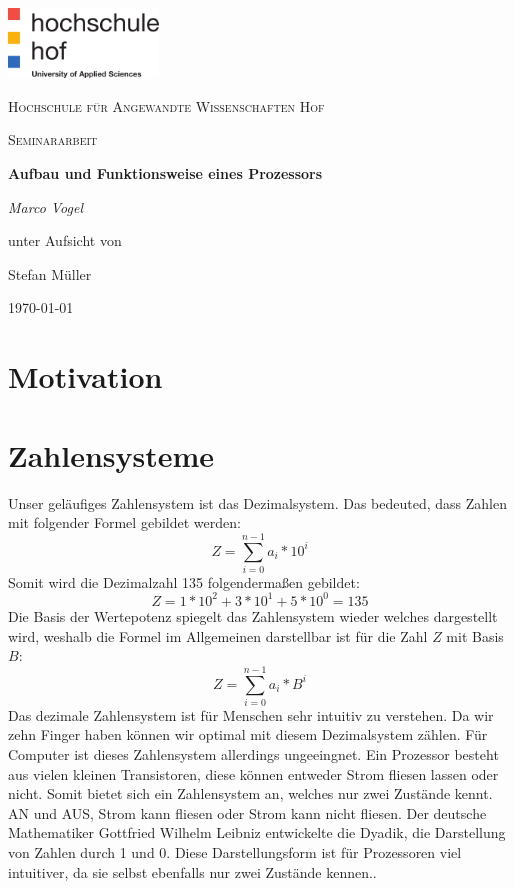 \documentclass[12pt]{article}
\begin{document}
\begin{titlepage}
	\centering
	\includegraphics[width=0.3\textwidth]{logo}\par\vspace{1cm}
	{\scshape\LARGE Hochschule für Angewandte Wissenschaften Hof \par}
	\vspace{1cm}
	{\scshape\Large Seminararbeit\par}
	\vspace{1.5cm}
	{\huge\bfseries Aufbau und Funktionsweise eines Prozessors\par}
	\vspace{2cm}
	{\Large\itshape Marco Vogel\par}
	\vfill
	unter Aufsicht von\par
	Stefan Müller
	\vfill
	{\large\today\par}
\end{titlepage}
\newpage


\tableofcontents
\newpage
\listofcodes




\section{Motivation}
\section{Zahlensysteme}
Unser geläufiges Zahlensystem ist das Dezimalsystem. Das bedeuted, dass Zahlen mit folgender Formel gebildet werden:
$$Z=\sum\limits_{i=0}^{n-1} a_i * 10^i$$
Somit wird die Dezimalzahl 135 folgendermaßen gebildet:$$Z=1*10^2+3*10^1+5*10^0 = 135$$
Die Basis der Wertepotenz spiegelt das Zahlensystem wieder welches dargestellt wird, weshalb die Formel im Allgemeinen darstellbar ist für die Zahl $Z$ mit Basis $B$:
$$Z=\sum\limits_{i=0}^{n-1} a_i * B^i$$
Das dezimale Zahlensystem ist für Menschen sehr intuitiv zu verstehen. Da wir zehn Finger haben können wir optimal mit diesem Dezimalsystem zählen. Für Computer ist dieses Zahlensystem allerdings ungeeingnet. Ein Prozessor besteht aus vielen kleinen Transistoren, diese können entweder Strom fliesen lassen oder nicht. Somit bietet sich ein Zahlensystem an, welches nur zwei Zustände kennt. AN und AUS, Strom kann fliesen oder Strom kann nicht fliesen. Der deutsche Mathematiker Gottfried Wilhelm Leibniz entwickelte die Dyadik, die Darstellung von Zahlen durch 1 und 0. Diese Darstellungsform ist für Prozessoren viel intuitiver, da sie selbst ebenfalls nur zwei Zustände kennen.\cite{wiki:dual}.
\end{document}
